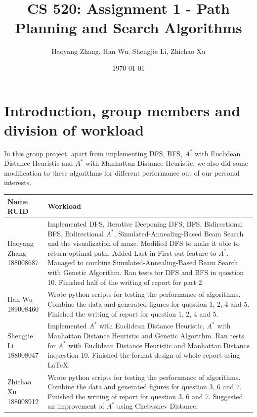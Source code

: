 \documentclass[letter]{article}
\title{CS 520: Assignment 1 - Path Planning and Search Algorithms}
\author{Haoyang Zhang, Han Wu, Shengjie Li, Zhichao Xu}
\date{\today}
\begin{document}
\maketitle

\section{Introduction, group members and division of workload}
\label{sec:Introduction}

In this group project, apart from implementing DFS, BFS, $ A^* $ with Euclidean Distance Heuristic and $ A^* $ with Manhattan Distance Heuristic, we also did some modification to these algorithms for different performance out of our personal interests.  \\
\begin{tabular}{| p{2.5cm} | p{11.5cm} |}
	\hline
	\makecell[c]{Name \\ RUID} & Workload \\
	\hline
	\makecell[c]{Haoyang Zhang \\ 188008687} & {Implemented DFS, Iterative Deepening DFS, BFS, Bidirectional BFS, Bidirectional $ A^* $, Simulated-Annealing-Based Beam Search and the visualization of maze. Modified DFS to make it able to return optimal path. Added Last-in First-out feature to $ A^* $. Managed to combine Simulated-Annealing-Based Beam Search with Genetic Algorithm. Ran tests for DFS and BFS in question 10. Finished half of the writing of report for part 2.} \\
	\hline
	\makecell[c]{Han Wu \\ 189008460} & {Wrote python scripts for testing the performance of algorithms. Combine the data and generated figures for question 1, 2, 4 and 5. Finished the writing of report for question 1, 2, 4 and 5.} \\
	\hline
	\makecell[c]{Shengjie Li \\ 188008047} & {Implemented $ A^* $ with Euclidean Distance Heuristic, $ A^* $ with Manhattan Distance Heuristic and Genetic Algorithm. Ran tests for $ A^* $ with Euclidean Distance Heuristic and Manhattan Distance inquestion 10. Finished the format design of whole report using \LaTeX. } \\
	\hline
	\makecell[c]{Zhichao Xu \\ 188008912} & {Wrote python scripts for testing the performance of algorithms. Combine the data and generated figures for question 3, 6 and 7. Finished the writing of report for question 3, 6 and 7. Suggested an improvement of $ A^* $ using Chebyshev Distance.} \\
	\hline
\end{tabular}
\end{document}
